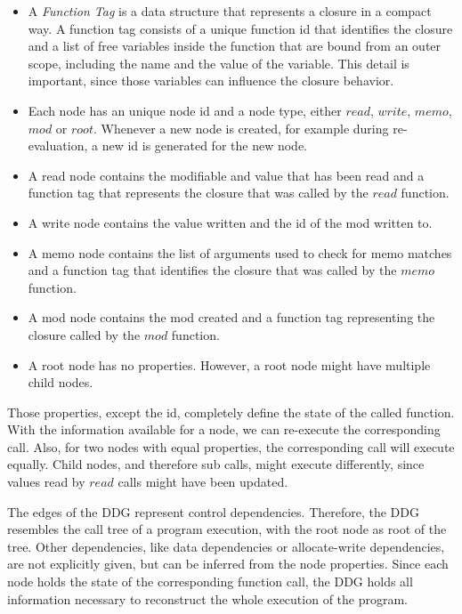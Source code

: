 \begin{itemize}

\item A \textit{Function Tag} is a data structure that represents a closure in a compact way. A function tag consists of a unique function id that identifies the closure and a list of free variables inside the function that are bound from an outer scope, including the name and the value of the variable. This detail is important, since those variables can influence the closure behavior.

\item Each node has an unique node id and a node type, either $read$, $write$, $memo$, $mod$ or $root$. Whenever a new node is created, for example during re-evaluation, a new id is generated for the new node.

\item A read node contains the modifiable and value that has been read and a function tag that represents the closure that was called by the $read$ function. 

\item A write node contains the value written and the id of the mod written to. 

\item A memo node contains the list of arguments used to check for memo matches and a function tag that identifies the closure that was called by the $memo$ function. 

\item A mod node contains the mod created and a function tag representing the closure called by the $mod$ function.

\item A root node has no properties. However, a root node might have multiple child nodes. 

\end{itemize}

Those properties, except the id, completely define the state of the called function. With the information available for a node, we can re-execute the corresponding call. Also, for two nodes with equal properties, the corresponding call will execute equally. Child nodes, and therefore sub calls, might execute differently, since values read by $read$ calls might have been updated. 

The edges of the DDG represent control dependencies. Therefore, the DDG resembles the call tree of a program execution, with the root node as root of the tree. Other dependencies, like data dependencies or allocate-write dependencies, are not explicitly given, but can be inferred from the node properties. Since each node holds the state of the corresponding function call, the DDG holds all information necessary to reconstruct the whole execution of the program. 

